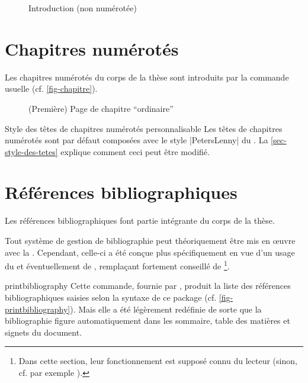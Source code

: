 \begin{figure}[p]
  \centering
  \caption{Introduction (non numérotée)}
  \label{fig-introduction}
\end{figure}

\section{Chapitres numérotés}
\label{sec-chapitres-numerotes}

Les chapitres numérotés du corps de la thèse sont introduits par la commande
usuelle  (cf. \vref{fig-chapitre}).

\begin{figure}[ht]
  \centering
  \caption[Chapitre \enquote{ordinaire}]{(Première) Page de chapitre
    \enquote{ordinaire}}
  \label{fig-chapitre}
\end{figure}

\begin{dbremark}{Style des têtes de chapitres numérotés personnalisable}{}
  Les têtes de chapitres numérotés sont par défaut composées avec le style
  |PetersLenny| du . La \vref{sec-style-des-tetes} explique
  comment ceci peut être modifié.
\end{dbremark}

\section{Références bibliographiques}

Les références bibliographiques font partie intégrante du corps de la thèse.

Tout système de gestion de bibliographie peut théoriquement être mis en œuvre
avec la \yatcl. Cependant, celle-ci a été conçue plus spécifiquement en vue
d'un usage du  et éventuellement de ,
remplaçant fortement conseillé de \footnote{Dans cette section,
  leur fonctionnement est supposé connu du lecteur (sinon, cf. par exemple
  \cite{en-ligne6}).}.

\begin{docCommand}[doc description=\mandatory]{printbibliography}{}
  Cette commande, fournie par , produit la liste des
  références bibliographiques saisies selon la syntaxe de ce package (cf.
  \vref{fig-printbibliography}). Mais elle a été légèrement redéfinie de sorte
  que la bibliographie figure automatiquement dans les sommaire, table des
  matières et signets du document.
\end{docCommand}

